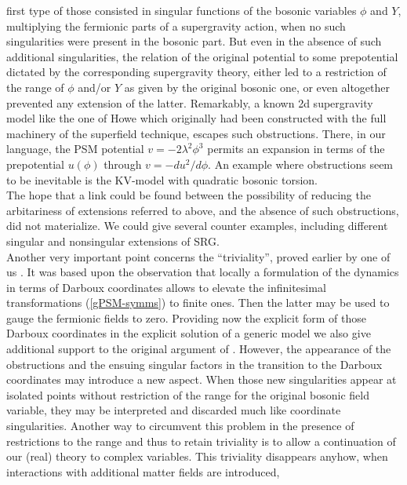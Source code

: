 \documentclass[a4paper,10pt]{article}
\renewcommand{\^}{{}^}
\renewcommand{\_}{\!{}_}
\begin{document}
first type of those consisted in singular functions of the 
bosonic variables $\phi$ and $Y$, multiplying the fermionic 
parts of a supergravity action, when no such singularities 
were present in the bosonic part. But even in the absence of 
such additional singularities, the relation of the original 
potential to some prepotential dictated by the 
corresponding supergravity theory, either led to a 
restriction of the range of $\phi$ and/or $Y$ as given by 
the original bosonic one, or even altogether prevented any 
extension of the latter. Remarkably, a known 2d supergravity 
model like the one of Howe \cite{Howe:1979ia} which 
originally had been  constructed 
with the full machinery of the superfield technique, escapes 
such obstructions. There, in our language, the PSM potential 
$v = -2 \lambda^2 
\phi^3$ permits an expansion in terms of the prepotential $u 
(\phi)$ through $v = -du^2/d\phi$. An example where 
obstructions seem to be inevitable is the KV-model \cite{Katanaev:1986wk} 
with quadratic bosonic torsion. \\
The hope that a link could be found between the possibility 
of reducing the arbitariness of extensions referred to above, and the 
absence of such obstructions, did not materialize. We could 
give several counter examples, including different singular 
and nonsingular extensions of SRG. \\
Another very important point concerns the ``triviality'', 
proved earlier by one of us \cite{Strobl:1999zz}. It was based upon the 
observation that locally a formulation of the dynamics in 
terms of Darboux  coordinates allows to elevate the 
infinitesimal transformations (\ref{gPSM-symms}) to finite ones. 
Then the  
latter may be used to gauge the fermionic fields to zero. 
Providing now the explicit form of those Darboux coordinates 
in the explicit solution of a generic model we also give 
additional support to the original argument of \cite{Strobl:1999zz}. 
However, the appearance of the obstructions and the ensuing 
singular factors in the transition to the Darboux 
coordinates may introduce a new aspect. When those new 
singularities appear at isolated points without restriction 
of the range for the original bosonic field variable, they 
may be interpreted and discarded much like coordinate singularities. 
Another way to circumvent this problem in the presence of 
restrictions to the range and thus to 
retain triviality is to 
allow a continuation of our (real) theory to complex 
variables.  This triviality disappears anyhow, when 
interactions with additional matter fields are introduced, 
\end{document}
